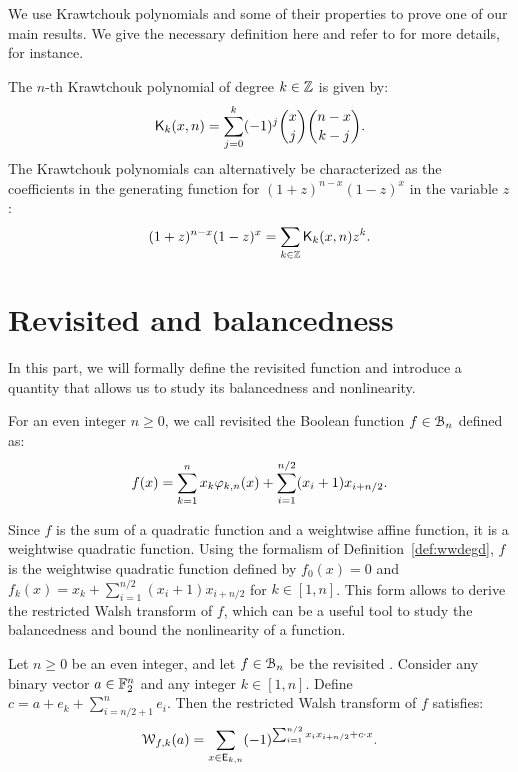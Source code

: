 \documentclass[11pt]{llncs}
\begin{document}
We use Krawtchouk polynomials and some of their properties to prove one of our main results. We give the necessary definition here and refer to \cite{book:MacSlo78} for more details, for instance.

\begin{definition}\label{def:Kraw}
	The $n$-th Krawtchouk polynomial of degree $k\in\mathbb{Z}$ is given by:
    \[
        \mathsf{K}_{k}(x,n)=\sum_{j=0}^{k} (-1)^j \binom{x}{j} \binom{n-x}{k-j}.
    \]
    The Krawtchouk polynomials can alternatively be characterized as the coefficients in the generating function for $(1+z)^{n-x} (1-z)^x$ in the variable $z$:
    \[
        (1+z)^{n-x} (1-z)^x=\sum_{k\in\mathbb{Z}} \mathsf{K}_{k}(x,n) z^k.
    \]
\end{definition} 

\section{Revisited \hwbf{} and balancedness}\label{sec:defAndBal}

In this part, we will formally define the revisited \hwbf{} function and introduce a quantity that allows us to study its balancedness and nonlinearity.

\begin{definition}\label{def:revHWBF}
	For an even integer $n\geq 0$, we call revisited \hwbf{} the Boolean function $f\in\mathcal{B}_n$ defined as:
	\[
		f(x)=\sum_{k=1}^nx_k\varphi_{k,n}(x)+\sum_{i=1}^{n/2}(x_i+1) x_{i+n/2}.
	\]
\end{definition}

Since $f$ is the sum of a quadratic function and a weightwise affine function, it is a weightwise quadratic function. Using the formalism of Definition~\ref{def:wwdegd}, $f$ is the weightwise quadratic function defined by $f_0(x)=0$ and $f_k(x)=x_k+\sum_{i=1}^{n/2}(x_i+1) x_{i+n/2}$ for $k\in[1,n]$. This form allows to derive the restricted Walsh transform of $f$, which can be a useful tool to study the balancedness and bound the nonlinearity of a function.

\begin{proposition}\label{prop:restrWT}
	Let $n\geq 0$ be an even integer, and let $f\in\mathcal{B}_n$ be the revisited \hwbf{}. Consider any binary vector $a\in\mathbb{F}_2^n$ and any integer $k\in[1,n]$. Define $c=a+e_k+\sum_{i=n/2+1}^n e_i$. Then the restricted Walsh transform of $f$ satisfies:
	\[
		\mathcal{W}_{f,k}(a)=\sum_{x \in \mathsf{E}_{k,n}} (-1)^{\sum_{i=1}^{n/2} x_i x_{i+n/2}+ c \cdot x}.
	\]
\end{proposition}
\end{document}
